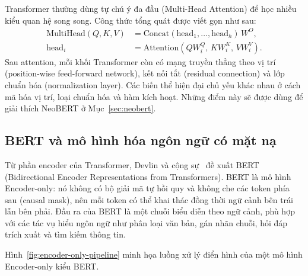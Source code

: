 Transformer thường dùng tự chú ý đa đầu (Multi-Head Attention) để học nhiều kiểu quan hệ
song song. Công thức tổng quát được viết gọn như sau:
\begin{equation}
  \label{eq:mha}
  \begin{aligned}
    \mathrm{MultiHead}(Q,K,V)
      &= \mathrm{Concat}(\mathrm{head}_1,\ldots,\mathrm{head}_h)\,W^O, \\
    \mathrm{head}_i
      &= \mathrm{Attention}(QW_i^Q,\,KW_i^K,\,VW_i^V).
  \end{aligned}
\end{equation}
Sau attention, mỗi khối Transformer còn có mạng truyền thẳng theo vị trí (position-wise
feed-forward network), kết nối tắt (residual connection) và lớp chuẩn hóa (normalization
layer). Các biến thể hiện đại chủ yếu khác nhau ở cách mã hóa vị trí, loại chuẩn hóa
và hàm kích hoạt. Những điểm này sẽ được dùng để giải thích NeoBERT ở Mục~\ref{sec:neobert}.

\subsection{BERT và mô hình hóa ngôn ngữ có mặt nạ}
\label{subsec:bert}

Từ phần encoder của Transformer, Devlin và cộng sự~\cite{devlin2019bert} đề xuất BERT
(Bidirectional Encoder Representations from Transformers). BERT là mô hình Encoder-only:
nó không có bộ giải mã tự hồi quy và không che các token phía sau (causal mask), nên mỗi
token có thể khai thác đồng thời ngữ cảnh bên trái lẫn bên phải. Đầu ra của BERT là một chuỗi biểu diễn theo
ngữ cảnh, phù hợp với các tác vụ hiểu ngôn ngữ như phân loại văn bản, gán nhãn chuỗi, hỏi
đáp trích xuất và tìm kiếm thông tin.

Hình~\ref{fig:encoder-only-pipeline} minh họa luồng xử lý điển hình của một mô hình
Encoder-only kiểu BERT.

